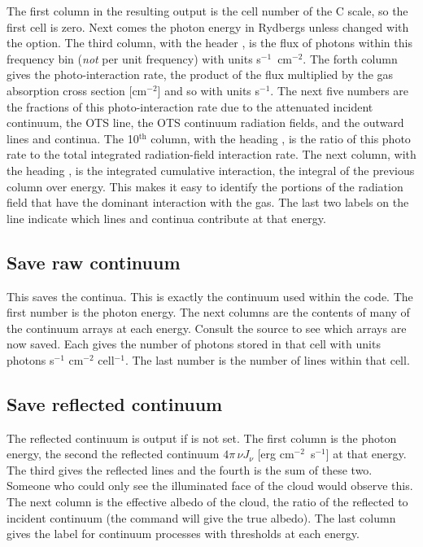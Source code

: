 The first column in the resulting output is the cell number
of the C scale, so the first cell is zero.
Next comes the photon energy
in Rydbergs unless changed with the  option.  The third column, with
the header , is the flux of photons within this frequency bin
(\emph{not}
per unit frequency) with units s$^{-1}$~cm$^{-2}$.  The forth column gives the
photo-interaction rate, the product of the flux multiplied by the gas
absorption cross section
[cm$^{-2}$] and so with units s$^{-1}$.  The next five numbers are the fractions of
this photo-interaction rate due to the attenuated incident continuum, the
OTS line, the OTS continuum radiation fields, and the outward lines and
continua.  The 10$^{\mathrm{th}}$ column, with the heading , is the ratio
of this photo rate to the total integrated radiation-field interaction rate.
The next column, with the heading , is the integrated cumulative
interaction, the integral of the previous column over energy.  This makes
it easy to identify the portions of the radiation field that have the
dominant interaction with the gas.  The last two labels on the line indicate
which lines and continua contribute at that energy.

\subsection{Save raw continuum}

This saves the  continua.
This is exactly the continuum used
within the code.  The first number is the photon energy.  The next columns
are the contents of many of the continuum arrays at each energy.  Consult
the source to see which arrays are now saved.  Each gives the number of
photons stored in that cell with units photons s$^{-1}$ cm$^{-2}$
cell$^{-1}$.  The last
number is the number of lines within that cell.

\subsection{Save reflected continuum}

The reflected continuum is output if  is not set.  The first column
is the photon energy, the second the reflected continuum $4\pi \,\nu J_\nu
$ [erg  cm$^{-2}$~s$^{-1}$] at that energy.  The third gives the reflected lines
and the fourth is the sum of these two.  Someone who could only see the
illuminated face of the cloud would observe this.  The next column is the
effective albedo of the cloud, the ratio of the reflected to incident
continuum (the  command will give the
true albedo).  The last column gives the label
for continuum processes with thresholds at each energy.

